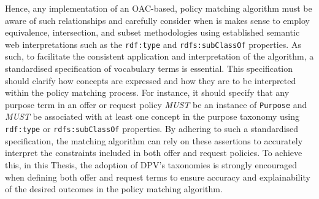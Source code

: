 Hence, any implementation of an OAC-based, policy matching algorithm must be aware of such relationships and carefully consider when is makes sense to employ equivalence, intersection, and subset methodologies using established semantic web interpretations such as the \texttt{rdf:type} and \texttt{rdfs:subClassOf} properties.
As such, to facilitate the consistent application and interpretation of the algorithm, a standardised specification of vocabulary terms is essential.
This specification should clarify how concepts are expressed and how they are to be interpreted within the policy matching process.
For instance, it should specify that any purpose term in an offer or request policy \textit{MUST} be an instance of \texttt{Purpose} and \textit{MUST} be associated with at least one concept in the purpose taxonomy using \texttt{rdf:type} or \texttt{rdfs:subClassOf} properties.
By adhering to such a standardised specification, the matching algorithm can rely on these assertions to accurately interpret the constraints included in both offer and request policies.
To achieve this, in this Thesis, the adoption of DPV's taxonomies is strongly encouraged when defining both offer and request terms to ensure accuracy and explainability of the desired outcomes in the policy matching algorithm.

